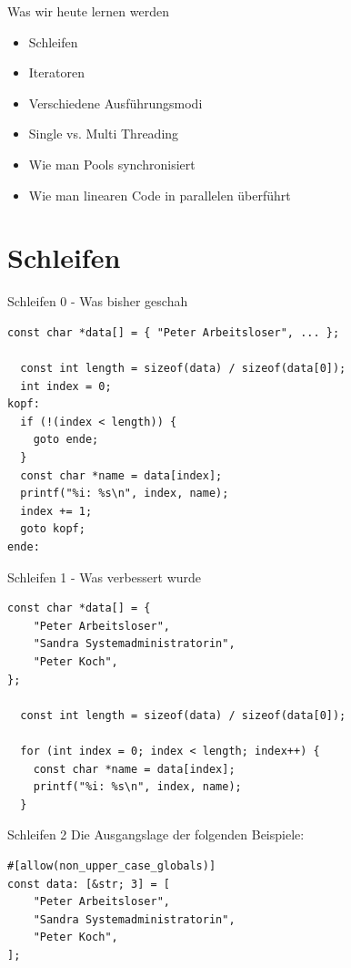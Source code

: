 \documentclass[aspectratio=1610,t]{beamer}
\begin{document}
\begin{frame}[fragile]{Was wir heute lernen werden}

\begin{itemize}
 \item Schleifen
 \item Iteratoren
 \item Verschiedene Ausführungsmodi
 \item Single vs. Multi Threading
 \item Wie man Pools synchronisiert
 \item Wie man linearen Code in parallelen überführt
\end{itemize}

\end{frame}

{
\section{Schleifen}
}

\begin{frame}[fragile]{Schleifen 0 - Was bisher geschah}
\begin{verbatim}
const char *data[] = { "Peter Arbeitsloser", ... };

  const int length = sizeof(data) / sizeof(data[0]);
  int index = 0;
kopf:
  if (!(index < length)) {
    goto ende;
  }
  const char *name = data[index];
  printf("%i: %s\n", index, name);
  index += 1;
  goto kopf;
ende:
\end{verbatim}
\end{frame}

\begin{frame}[fragile]{Schleifen 1 - Was verbessert wurde}
\begin{verbatim}
const char *data[] = {
    "Peter Arbeitsloser",
    "Sandra Systemadministratorin",
    "Peter Koch",
};

  const int length = sizeof(data) / sizeof(data[0]);

  for (int index = 0; index < length; index++) {
    const char *name = data[index];
    printf("%i: %s\n", index, name);
  }
\end{verbatim}
\end{frame}

\begin{frame}[fragile]{Schleifen 2}
Die Ausgangslage der folgenden Beispiele:

\begin{verbatim}
#[allow(non_upper_case_globals)]
const data: [&str; 3] = [
    "Peter Arbeitsloser",
    "Sandra Systemadministratorin",
    "Peter Koch",
];
\end{verbatim}
\end{frame}
\end{document}
